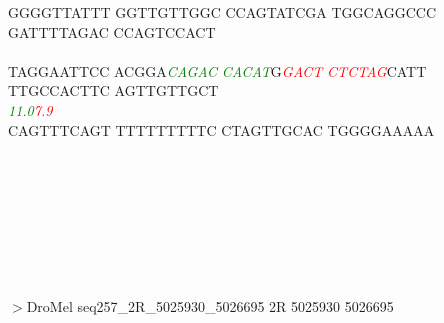 \documentclass[11pt,twoside,reqno,a4paper]{article}
\begin{document}
{GGGGTTATTT	GGTTGTTGGC	CCAGTATCGA	TGGCAGGCCC	GATTTTAGAC	CCAGTCCACT	\\
\hspace*{1\charwidth}\hspace*{1\charwidth}\hspace*{1\charwidth}\hspace*{1\charwidth}\hspace*{1\charwidth}\hspace*{1\charwidth}\\
TAGGAATTCC	ACGGA\textit{\textcolor{Green}{C}}\textit{\textcolor{Green}{A}}\textit{\textcolor{Green}{G}}\textit{\textcolor{Green}{A}}\textit{\textcolor{Green}{C}}	\textit{\textcolor{Green}{C}}\textit{\textcolor{Green}{A}}\textit{\textcolor{Green}{C}}\textit{\textcolor{Green}{A}}\textit{\textcolor{Green}{T}}G\textit{\textcolor{Red}{G}}\textit{\textcolor{Red}{A}}\textit{\textcolor{Red}{C}}\textit{\textcolor{Red}{T}}	\textit{\textcolor{Red}{C}}\textit{\textcolor{Red}{T}}\textit{\textcolor{Red}{C}}\textit{\textcolor{Red}{T}}\textit{\textcolor{Red}{A}}\textit{\textcolor{Red}{G}}CATT	TTGCCACTTC	AGTTGTTGCT	\\
\hspace*{1\charwidth}\hspace*{15\charwidth}\textit{\textcolor{Green}{11.0}}\hspace*{1\charwidth}\hspace*{1\charwidth}\hspace*{-118\charwidth}\textit{\textcolor{Red}{7.9}}\hspace*{1\charwidth}\hspace*{1\charwidth}\hspace*{1\charwidth}\hspace*{1\charwidth}\\
CAGTTTCAGT	TTTTTTTTTC	CTAGTTGCAC	TGGGGAAAAA	\\
\hspace*{1\charwidth}\hspace*{1\charwidth}\hspace*{1\charwidth}\hspace*{1\charwidth}\\
\\
\\
\\
\\
\\
\\
}
\\
$>$DroMel	seq257\_2R\_5025930\_5026695	2R	5025930	5026695 \\
\end{document}
